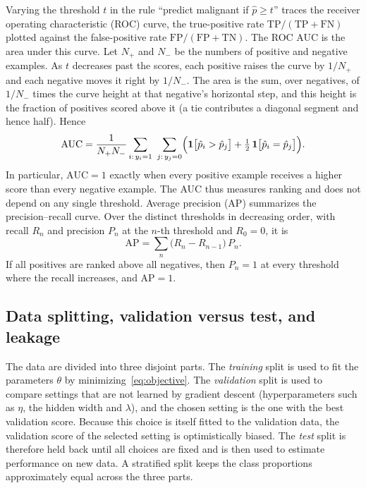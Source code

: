 Varying the threshold $t$ in the rule ``predict malignant if $\hat p\ge t$'' traces the receiver operating characteristic (ROC) curve, the true-positive rate $\mathrm{TP}/(\mathrm{TP}+\mathrm{FN})$ plotted against the false-positive rate $\mathrm{FP}/(\mathrm{FP}+\mathrm{TN})$. The ROC AUC is the area under this curve. Let $N_{+}$ and $N_{-}$ be the numbers of positive and negative examples. As $t$ decreases past the scores, each positive raises the curve by $1/N_{+}$ and each negative moves it right by $1/N_{-}$. The area is the sum, over negatives, of $1/N_{-}$ times the curve height at that negative's horizontal step, and this height is the fraction of positives scored above it (a tie contributes a diagonal segment and hence half). Hence
\begin{equation}
  \mathrm{AUC}=\frac{1}{N_{+}N_{-}}\sum_{i:\,y_i=1}\ \sum_{j:\,y_j=0}\Bigl(\mathbf{1}\bigl[\hat p_i>\hat p_j\bigr]+\tfrac12\,\mathbf{1}\bigl[\hat p_i=\hat p_j\bigr]\Bigr).
  \label{eq:auc}
\end{equation}
In particular, $\mathrm{AUC}=1$ exactly when every positive example receives a higher score than every negative example. The AUC thus measures ranking and does not depend on any single threshold. Average precision (AP) summarizes the precision--recall curve. Over the distinct thresholds in decreasing order, with recall $R_n$ and precision $P_n$ at the $n$-th threshold and $R_0=0$, it is
\begin{equation}
  \mathrm{AP}=\sum_{n}\bigl(R_n-R_{n-1}\bigr)\,P_n .
  \label{eq:ap}
\end{equation}
If all positives are ranked above all negatives, then $P_n=1$ at every threshold where the recall increases, and $\mathrm{AP}=1$.

\subsection{Data splitting, validation versus test, and leakage}
\label{sec:prelim-split}

The data are divided into three disjoint parts. The \emph{training} split is used to fit the parameters $\theta$ by minimizing~\eqref{eq:objective}. The \emph{validation} split is used to compare settings that are not learned by gradient descent (hyperparameters such as $\eta$, the hidden width and $\lambda$), and the chosen setting is the one with the best validation score. Because this choice is itself fitted to the validation data, the validation score of the selected setting is optimistically biased. The \emph{test} split is therefore held back until all choices are fixed and is then used to estimate performance on new data. A stratified split keeps the class proportions approximately equal across the three parts.

